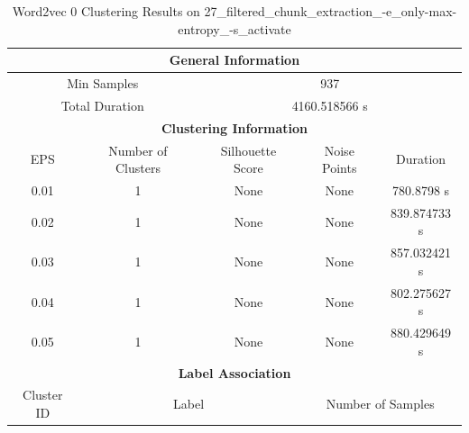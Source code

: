 \begin{longtable}{|c|c|c|c|c|}
\caption{Word2vec 0 Clustering Results on 27\_filtered\_chunk\_extraction\_-e\_only-max-entropy\_-s\_activate} \label{tab:27_filtered_chunk_extraction_-e_only-max-entropy_-s_activate_word2vec_0_clustering_results}\\
\hline
\multicolumn{5}{|c|}{\textbf{General Information}} \\
\hline
\multicolumn{2}{|c|}{Min Samples} & \multicolumn{3}{c|}{937} \\
\multicolumn{2}{|c|}{Total Duration} & \multicolumn{3}{c|}{4160.518566 s} \\
\hline
\multicolumn{5}{|c|}{\textbf{Clustering Information}} \\
\hline
EPS & Number of Clusters & Silhouette Score & Noise Points & Duration \\
0.01 & 1 & None & None & 780.8798 s\\
0.02 & 1 & None & None & 839.874733 s\\
0.03 & 1 & None & None & 857.032421 s\\
0.04 & 1 & None & None & 802.275627 s\\
0.05 & 1 & None & None & 880.429649 s\\
\hline
\multicolumn{5}{|c|}{\textbf{Label Association}} \\
\hline
Cluster ID & \multicolumn{2}{c|}{Label} & \multicolumn{2}{c|}{Number of Samples} \\
\hline
\end{longtable}


